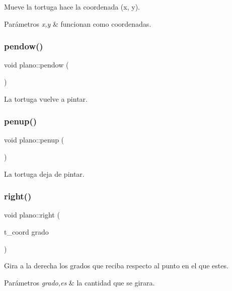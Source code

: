 Mueve la tortuga hace la coordenada (x, y). 
\begin{DoxyParams}{Parámetros}
{\em x,y} & funcionan como coordenadas. \\
\hline
\end{DoxyParams}
\mbox{\label{classplano_aa2ae0a48000f85adfc61663ae7011aa2}} 
\subsubsection{\texorpdfstring{pendow()}{pendow()}}
{\footnotesize\ttfamily void plano\+::pendow (\begin{DoxyParamCaption}{ }\end{DoxyParamCaption})}

La tortuga vuelve a pintar. \mbox{\label{classplano_a48e4fbc9361ecaffe8a18545825ae19b}} 
\subsubsection{\texorpdfstring{penup()}{penup()}}
{\footnotesize\ttfamily void plano\+::penup (\begin{DoxyParamCaption}{ }\end{DoxyParamCaption})}

La tortuga deja de pintar. \mbox{\label{classplano_a350bd814b14e4a876b601e608c4b7217}} 
\subsubsection{\texorpdfstring{right()}{right()}}
{\footnotesize\ttfamily void plano\+::right (\begin{DoxyParamCaption}\item[{t\+\_\+coord}]{grado }\end{DoxyParamCaption})}

Gira a la derecha los grados que reciba respecto al punto en el que estes. 
\begin{DoxyParams}{Parámetros}
{\em grado,es} & la cantidad que se girara. \\
\hline
\end{DoxyParams}
\mbox{\label{classplano_a5758a4e96e2140941dd150e91e6029fd}} 
